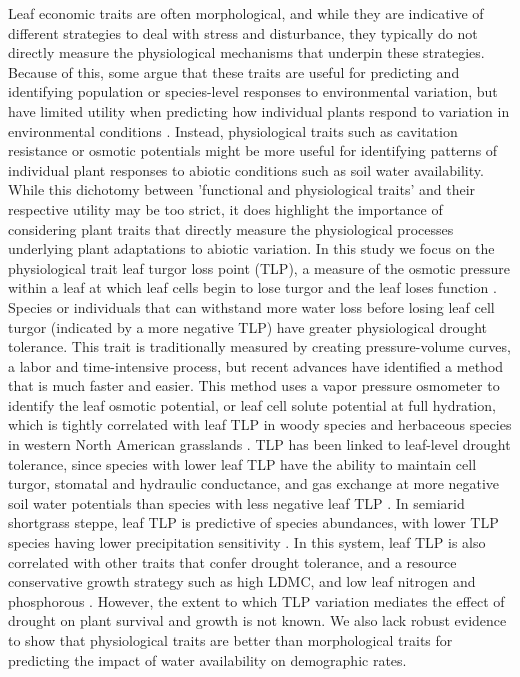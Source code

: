 \documentclass[12pt, letterpaper]{article}
\begin{document}
Leaf economic traits are often morphological, and while they are indicative of different strategies to deal with stress and disturbance, they typically do not directly measure the physiological mechanisms that underpin these strategies. Because of this, some argue that these traits are useful for predicting and identifying population or species-level responses to environmental variation, but have limited utility when predicting how individual plants respond to variation in environmental conditions \citep{Volaire2018}. Instead, physiological traits such as cavitation resistance or osmotic potentials might be more useful for identifying patterns of individual plant responses to abiotic conditions such as soil water availability. While this dichotomy between ’functional and physiological traits’ and their respective utility may be too strict, it does highlight the importance of considering plant traits that directly measure the physiological processes underlying plant adaptations to abiotic variation.
In this study we focus on the physiological trait leaf turgor loss point (TLP), a measure of the osmotic pressure within a leaf at which leaf cells begin to lose turgor and the leaf loses function \citep{Bartlett2012, Bartlett2016TheDrought}. Species or individuals that can withstand more water loss before losing leaf cell turgor (indicated by a more negative TLP) have greater physiological drought tolerance. This trait is traditionally measured by creating pressure-volume curves, a labor and time-intensive process, but recent advances have identified a method that is much faster and easier. This method uses a vapor pressure osmometer to identify the leaf osmotic potential, or leaf cell solute potential at full hydration, which is tightly correlated with leaf TLP in woody species \citep{Bartlett2012a} and herbaceous species in western North American grasslands \citep{Griffin-Nolan2019}. TLP has been linked to leaf-level drought tolerance, since species with lower leaf TLP have the ability to maintain cell turgor, stomatal and hydraulic conductance, and gas exchange at more negative soil water potentials than species with less negative leaf TLP \citep{Bartlett2012}. In semiarid shortgrass steppe, leaf TLP is predictive of species abundances, with lower TLP species having lower precipitation sensitivity \citep{Wilcox2020PlantPrairie}. In this system, leaf TLP is also correlated with other traits that confer drought tolerance, and a resource conservative growth strategy such as high LDMC, and low leaf nitrogen and phosphorous \citep{Blumenthal2020}. However, the extent to which TLP variation mediates the effect of drought on plant survival and growth is not known. We also lack robust evidence to show that physiological traits are better than morphological traits for predicting the impact of water availability on demographic rates.
\end{document}
